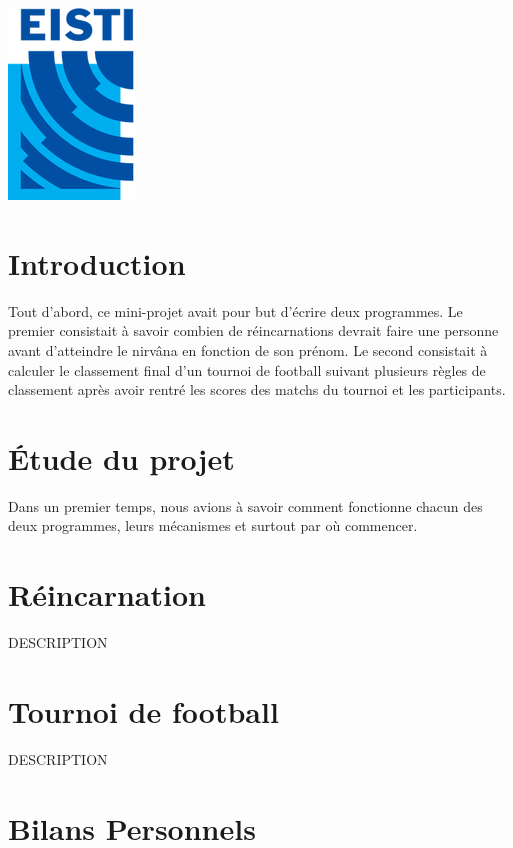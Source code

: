\documentclass[12pt]{article}
\begin{document}
\begin{titlepage}
\includegraphics{Logo_EISTI.png}\\[1cm] %
 

\vfill %

\end{titlepage}

\tableofcontents
\newpage

\section{Introduction}

Tout d'abord, ce mini-projet avait pour but d'écrire deux programmes. 
Le premier consistait à savoir combien de réincarnations devrait faire une personne avant d'atteindre le nirvâna en fonction de son prénom.
Le second consistait à calculer le classement final d'un tournoi de football suivant plusieurs règles de classement après avoir rentré les scores des matchs du tournoi et les participants. 

\section{Étude du projet}
Dans un premier temps, nous avions à savoir comment fonctionne chacun des deux programmes, leurs mécanismes et surtout par où commencer. 

\section{Réincarnation}
DESCRIPTION
\section{Tournoi de football}
DESCRIPTION
\section{Bilans Personnels}
\end{document}
